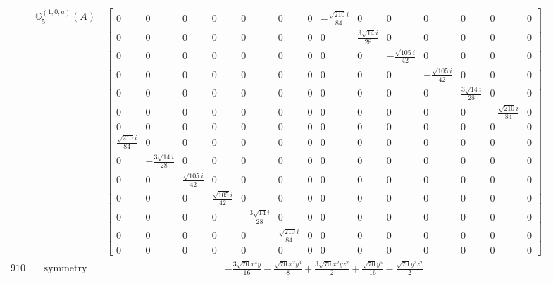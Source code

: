 \documentclass[fleqn,8pt,landscape]{jsarticle}
\begin{document}
\begin{longtable}{ccc}
$  $ & $ \mathbb{G}_{5}^{(1,0;a)}(A) $ & $ \begin{bmatrix} 0 & 0 & 0 & 0 & 0 & 0 & 0 & - \frac{\sqrt{210} i}{84} & 0 & 0 & 0 & 0 & 0 & 0 \\ 0 & 0 & 0 & 0 & 0 & 0 & 0 & 0 & \frac{3 \sqrt{14} i}{28} & 0 & 0 & 0 & 0 & 0 \\ 0 & 0 & 0 & 0 & 0 & 0 & 0 & 0 & 0 & - \frac{\sqrt{105} i}{42} & 0 & 0 & 0 & 0 \\ 0 & 0 & 0 & 0 & 0 & 0 & 0 & 0 & 0 & 0 & - \frac{\sqrt{105} i}{42} & 0 & 0 & 0 \\ 0 & 0 & 0 & 0 & 0 & 0 & 0 & 0 & 0 & 0 & 0 & \frac{3 \sqrt{14} i}{28} & 0 & 0 \\ 0 & 0 & 0 & 0 & 0 & 0 & 0 & 0 & 0 & 0 & 0 & 0 & - \frac{\sqrt{210} i}{84} & 0 \\ 0 & 0 & 0 & 0 & 0 & 0 & 0 & 0 & 0 & 0 & 0 & 0 & 0 & 0 \\ \frac{\sqrt{210} i}{84} & 0 & 0 & 0 & 0 & 0 & 0 & 0 & 0 & 0 & 0 & 0 & 0 & 0 \\ 0 & - \frac{3 \sqrt{14} i}{28} & 0 & 0 & 0 & 0 & 0 & 0 & 0 & 0 & 0 & 0 & 0 & 0 \\ 0 & 0 & \frac{\sqrt{105} i}{42} & 0 & 0 & 0 & 0 & 0 & 0 & 0 & 0 & 0 & 0 & 0 \\ 0 & 0 & 0 & \frac{\sqrt{105} i}{42} & 0 & 0 & 0 & 0 & 0 & 0 & 0 & 0 & 0 & 0 \\ 0 & 0 & 0 & 0 & - \frac{3 \sqrt{14} i}{28} & 0 & 0 & 0 & 0 & 0 & 0 & 0 & 0 & 0 \\ 0 & 0 & 0 & 0 & 0 & \frac{\sqrt{210} i}{84} & 0 & 0 & 0 & 0 & 0 & 0 & 0 & 0 \\ 0 & 0 & 0 & 0 & 0 & 0 & 0 & 0 & 0 & 0 & 0 & 0 & 0 & 0 \end{bmatrix} $ \\ \hline
$ 910 $ & $ \text{symmetry} $ & $ - \frac{3 \sqrt{70} x^{4} y}{16} - \frac{\sqrt{70} x^{2} y^{3}}{8} + \frac{3 \sqrt{70} x^{2} y z^{2}}{2} + \frac{\sqrt{70} y^{5}}{16} - \frac{\sqrt{70} y^{3} z^{2}}{2} $ \\

\end{longtable}
\end{document}
